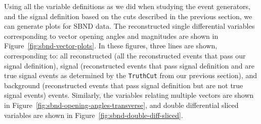 \documentclass{article}
\begin{document}
Using all the variable definitions as we did when studying the event generators, and the signal definition based on the cuts described in the previous section, we can generate plots for SBND data. The reconstructed single differential variables corresponding to vector opening angles and magnitudes are shown in Figure~\ref{fig:sbnd-vector-plots}. In these figures, three lines are shown, corresponding to: all reconstructed (all the reconstructed events that pass our signal definition), signal (reconstructed events that pass signal definition and are true signal events as determined by the \verb|TruthCut| from our previous section), and background (reconstructed events that pass signal definition but are not true signal events) events. Similarly, the variables relating multiple vectors are shown in Figure~\ref{fig:sbnd-opening-angles-transverse}, and double differential sliced variables are shown in Figure~\ref{fig:sbnd-double-diff-sliced}.
\end{document}
